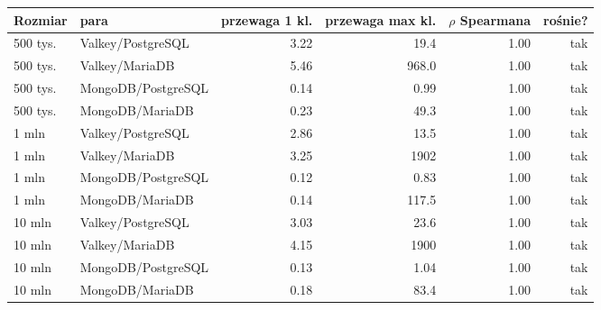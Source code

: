 \begin{tabular}{llrrrr}
\toprule
Rozmiar & para & przewaga 1 kl. & przewaga max kl. & $\rho$ Spearmana & rośnie? \\
\midrule
500 tys. & Valkey/PostgreSQL & \num{3.22} & \num{19.4} & \num{1.00} & tak \\
500 tys. & Valkey/MariaDB & \num{5.46} & \num{968.0} & \num{1.00} & tak \\
500 tys. & MongoDB/PostgreSQL & \num{0.14} & \num{0.99} & \num{1.00} & tak \\
500 tys. & MongoDB/MariaDB & \num{0.23} & \num{49.3} & \num{1.00} & tak \\
1 mln & Valkey/PostgreSQL & \num{2.86} & \num{13.5} & \num{1.00} & tak \\
1 mln & Valkey/MariaDB & \num{3.25} & \num{1902} & \num{1.00} & tak \\
1 mln & MongoDB/PostgreSQL & \num{0.12} & \num{0.83} & \num{1.00} & tak \\
1 mln & MongoDB/MariaDB & \num{0.14} & \num{117.5} & \num{1.00} & tak \\
10 mln & Valkey/PostgreSQL & \num{3.03} & \num{23.6} & \num{1.00} & tak \\
10 mln & Valkey/MariaDB & \num{4.15} & \num{1900} & \num{1.00} & tak \\
10 mln & MongoDB/PostgreSQL & \num{0.13} & \num{1.04} & \num{1.00} & tak \\
10 mln & MongoDB/MariaDB & \num{0.18} & \num{83.4} & \num{1.00} & tak \\
\bottomrule
\end{tabular}
